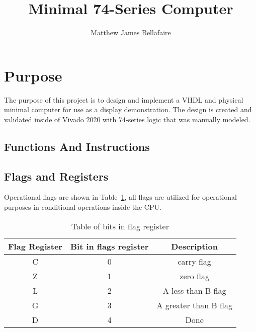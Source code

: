 \documentclass[11pt]{article} %
\title{Minimal 74-Series Computer}
\author{Matthew James Bellafaire}
\begin{document}
\maketitle

\tableofcontents
\listoffigures

\section{Purpose}

The purpose of this project is to design and implement a VHDL and physical minimal computer for use as a display demonstration. 
The design is created and validated inside of Vivado 2020 with 74-series logic that was manually modeled. 

\subsection{Functions And Instructions}



\subsection{Flags and Registers}
Operational flags are shown in Table~\ref{tabFlags}, all flags are utilized for operational purposes in conditional operations inside the CPU.

\begin{table}
	\centering
\begin{tabular}{| c | c | c |}
\hline
Flag Register & Bit in flags register & Description \\
\hline
C & 0 & carry flag \\
Z & 1 & zero flag \\
L & 2 & A less than B flag \\
G & 3 & A greater than B flag \\
D& 4& Done\\
\hline
\end{tabular}
\caption{Table of bits in flag register}
\label{tabFlags}
\end{table}
\end{document}
